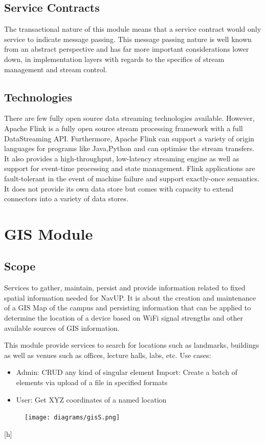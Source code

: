 \documentclass[12pt]{article}
\begin{document}
\subsection{Service Contracts}
The transactional nature of this module means that a service contract would only service to indicate message passing. This message passing nature is well known from an abstract perspective and has far more important considerations lower down, in implementation layers with regards to the specifics of stream management and stream control.

\subsection{Technologies}
There are few fully open source data streaming technologies available. However, Apache Flink is a fully open source stream processing framework with a full DataStreaming API. Furthermore, Apache Flink can support a variety of origin languages for programs like Java,Python and can optimise the stream transfers. It also provides a high-throughput, low-latency streaming engine as well as support for event-time processing and state management. Flink applications are fault-tolerant in the event of machine failure and support exactly-once semantics. It does not provide its own data store but comes with capacity to extend connectors into a variety of data stores.

\section{GIS Module}
\subsection{Scope}
Services to gather, maintain, persist and provide information related to fixed spatial information needed for NavUP.  It is about the creation and maintenance of a GIS Map of the campus and persisting  information that can be applied to determine the location of a device based on WiFi signal strengths and other available sources of GIS information. 

This module provide services to search for locations such as landmarks, buildings as well as venues such as offices, lecture halls, labs, etc.
Use cases:
\begin{itemize}
\item Admin:
    CRUD any kind of singular element
    Import: Create a batch of elements via upload of a file in specified formats
\item User:
    Get XYZ coordinates of a named location

\end{itemize}
\begin{figure}
\centering
\texttt{[image: diagrams/gisS.png]}

\end{figure}[h]
\end{document}
